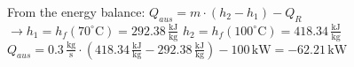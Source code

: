 From the energy balance:  
\( Q_{aus} = m \cdot (h_2 - h_1) - Q_R \)  
\( \rightarrow h_1 = h_f(70^\circ \text{C}) = 292.38 \, \frac{\text{kJ}}{\text{kg}} \)  
\( h_2 = h_f(100^\circ \text{C}) = 418.34 \, \frac{\text{kJ}}{\text{kg}} \)  
\( Q_{aus} = 0.3 \, \frac{\text{kg}}{\text{s}} \cdot (418.34 \, \frac{\text{kJ}}{\text{kg}} - 292.38 \, \frac{\text{kJ}}{\text{kg}}) - 100 \, \text{kW} = -62.21 \, \text{kW} \)